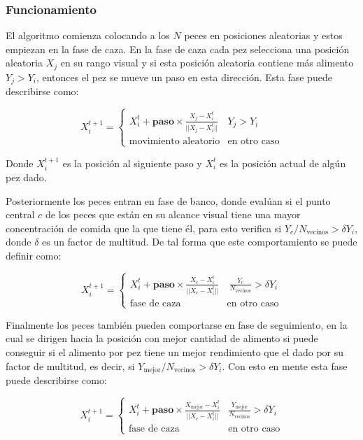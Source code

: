 \documentclass[twocolumn,spanish]{revtex4-1}
\begin{document}
\subsubsection{Funcionamiento}
El algoritmo comienza colocando a los $N$ peces en posiciones aleatorias y estos empiezan en la fase de caza. En la fase de caza cada pez selecciona una posición aleatoria $X_{j}$ en su rango visual y si esta posición aleatoria contiene más alimento $Y_j > Y_i$, entonces el pez se mueve un paso en esta dirección. Esta fase puede describirse como:

\begin{equation*}
    X_i^{t+1} = 
    \begin{cases}
     X_i^{t} + \textbf{paso}\times \frac{X_j-X_i^t}{||X_j-X_i^t||} & Y_j > Y_i\\
     \text{movimiento aleatorio} & \text{en otro caso}
    \end{cases}
\end{equation*}

Donde $X_i^{t+1}$ es la posición al siguiente paso y $X_i^{t}$ es la posición actual de algún pez dado.

Posteriormente los peces entran en fase de banco, donde evalúan si el punto central $c$ de los peces que están en su alcance visual tiene una mayor concentración de comida que la que tiene él, para esto verifica si $Y_c/N_{\text{vecinos}} > \delta Y_i$, donde $\delta$ es un factor de multitud. De tal forma que este comportamiento se puede definir como:

\begin{equation*}
    X_i^{t+1} = 
    \begin{cases}
     X_i^{t} + \textbf{paso}\times \frac{X_c-X_i^t}{||X_c-X_i^t||} & \ \frac{Y_c}{N_{\text{vecinos}}} > \delta Y_i\\
     \text{fase de caza} & \text{en otro caso}
    \end{cases}
\end{equation*}

Finalmente los peces también pueden comportarse en fase de seguimiento, en la cual se dirigen hacia la posición con mejor cantidad de alimento si puede conseguir si el alimento por pez tiene un mejor rendimiento que el dado por su factor de multitud, es decir, si   $Y_{\text{mejor}}/N_{\text{vecinos}} > \delta Y_i$. Con esto en mente esta fase puede describirse como:

\begin{equation*}
    X_i^{t+1} = 
    \begin{cases}
     X_i^{t} + \textbf{paso}\times \frac{X_{\text{mejor}}-X_i^t}{||X_c-X_i^t||} & \frac{Y_{\text{mejor}}}{N_{\text{vecinos}}} > \delta Y_i\\
     \text{fase de caza} & \text{en otro caso}
    \end{cases}
\end{equation*}
\end{document}
